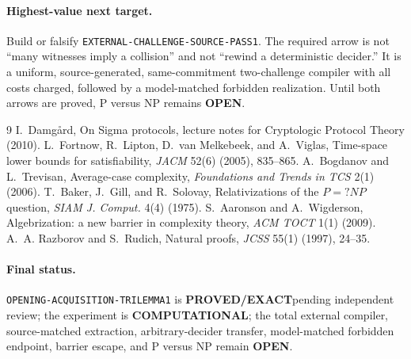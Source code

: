 \documentclass[11pt]{article}
\newcommand{\EXACT}{\textbf{PROVED/EXACT}}
\newcommand{\COMP}{\textbf{COMPUTATIONAL}}
\newcommand{\OPEN}{\textbf{OPEN}}
\begin{document}
\paragraph{Highest-value next target.}
Build or falsify \texttt{EXTERNAL-CHALLENGE-SOURCE-PASS1}.  The required arrow
is not ``many witnesses imply a collision'' and not ``rewind a deterministic
decider.''  It is a uniform, source-generated, same-commitment two-challenge
compiler with all costs charged, followed by a model-matched forbidden
realization.  Until both arrows are proved, P versus NP remains \OPEN.

\begin{thebibliography}{9}
 I.~Damg\aa rd,
On Sigma protocols, lecture notes for Cryptologic Protocol Theory (2010).
 L.~Fortnow, R.~Lipton, D.~van Melkebeek, and A.~Viglas,
Time-space lower bounds for satisfiability, \emph{JACM} 52(6) (2005), 835--865.
 A.~Bogdanov and L.~Trevisan,
Average-case complexity, \emph{Foundations and Trends in TCS} 2(1) (2006).
 T.~Baker, J.~Gill, and R.~Solovay,
Relativizations of the $P=?NP$ question, \emph{SIAM J. Comput.} 4(4) (1975).
 S.~Aaronson and A.~Wigderson,
Algebrization: a new barrier in complexity theory, \emph{ACM TOCT} 1(1) (2009).
 A.~A. Razborov and S.~Rudich,
Natural proofs, \emph{JCSS} 55(1) (1997), 24--35.
\end{thebibliography}

\paragraph{Final status.}
\texttt{OPENING-ACQUISITION-TRILEMMA1} is \EXACT pending independent review;
the experiment is \COMP; the total external compiler, source-matched
extraction, arbitrary-decider transfer, model-matched forbidden endpoint,
barrier escape, and P versus NP remain \OPEN.
\end{document}

